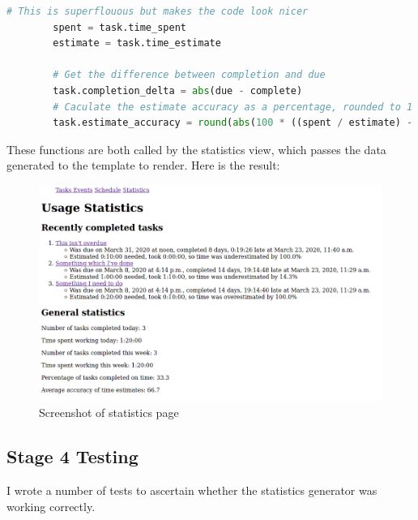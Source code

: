 \documentclass{article}
\begin{document}
\begin{lstlisting}[language=Python]
        # This is superflouous but makes the code look nicer
        spent = task.time_spent
        estimate = task.time_estimate

        # Get the difference between completion and due
        task.completion_delta = abs(due - complete)
        # Caculate the estimate accuracy as a percentage, rounded to 1 d.p.
        task.estimate_accuracy = round(abs(100 * ((spent / estimate) - 1)), 1)
\end{lstlisting}

These functions are both called by the statistics view,
which passes the data generated to the template to render.
Here is the result:
\begin{figure}[H]
	\includegraphics[width=\linewidth]{Screenshots/statistics.png}
	\caption{Screenshot of statistics page}
	\label{fig:statistics1}
\end{figure}

\subsection{Stage 4 Testing}
I wrote a number of tests to ascertain whether the statistics generator was working correctly.
\end{document}
